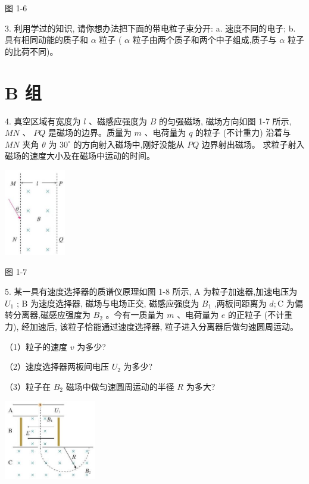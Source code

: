 \documentclass[10pt]{article}
\begin{document}
图 1-6

3. 利用学过的知识, 请你想办法把下面的带电粒子束分开: a. 速度不同的电子; b. 具有相同动能的质子和 \(\alpha\) 粒子 ( \(\alpha\) 粒子由两个质子和两个中子组成,质子与 \(\alpha\) 粒子的比荷不同)。

\section*{B 组}

4. 真空区域有宽度为 \(l\) 、磁感应强度为 \(B\) 的匀强磁场, 磁场方向如图 1-7 所示, \({MN}\) 、 \({PQ}\) 是磁场的边界。质量为 \(m\) 、电荷量为 \(q\) 的粒子 (不计重力) 沿着与 \({MN}\) 夹角 \(\theta\) 为 \({30}^{ \circ }\) 的方向射入磁场中,刚好没能从 \({PQ}\) 边界射出磁场。 求粒子射入磁场的速度大小及在磁场中运动的时间。

\begin{center}
\includegraphics[max width=0.2\textwidth]{images/01910e72-c5b7-7ed5-a6d4-fb3a5faefc32_27_322475.jpg}
\end{center}

图 1-7

5. 某一具有速度选择器的质谱仪原理如图 1-8 所示, \(\mathrm{A}\) 为粒子加速器,加速电压为 \({U}_{1}\) ; B 为速度选择器, 磁场与电场正交, 磁感应强度为 \({B}_{1}\) ,两板间距离为 \(d;\mathrm{C}\) 为偏转分离器,磁感应强度为 \({B}_{2}\) 。今有一质量为 \(m\) 、电荷量为 \(e\) 的正粒子 (不计重力), 经加速后, 该粒子恰能通过速度选择器, 粒子进入分离器后做匀速圆周运动。

（1）粒子的速度 \(v\) 为多少?

（2）速度选择器两板间电压 \({U}_{2}\) 为多少?

（3）粒子在 \({B}_{2}\) 磁场中做匀速圆周运动的半径 \(R\) 为多大?

\begin{center}
\includegraphics[max width=0.3\textwidth]{images/01910e72-c5b7-7ed5-a6d4-fb3a5faefc32_27_978805.jpg}
\end{center}
\end{document}
